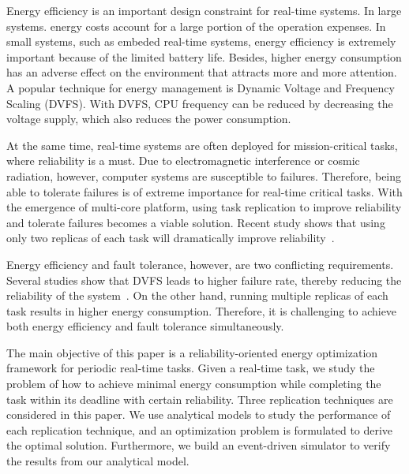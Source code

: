 Energy efficiency is an important design constraint for real-time systems. In large systems. energy costs account for a large portion of the operation expenses. In small systems, such as embeded real-time systems, energy efficiency is extremely important because of the limited battery life. Besides, higher energy consumption has an adverse effect on the environment that attracts more and more attention. 
A popular technique for energy management is Dynamic Voltage and Frequency Scaling (DVFS). With DVFS, CPU frequency can be reduced by decreasing the voltage supply, which also reduces the power consumption. 

At the same time, real-time systems are often deployed for mission-critical tasks, where reliability is a must. Due to electromagnetic interference or cosmic radiation, however, computer systems are susceptible to failures. Therefore, being able to tolerate failures is of extreme importance for real-time critical tasks.  
With the emergence of multi-core platform, using task replication to improve reliability and tolerate failures becomes a viable solution. Recent study shows that using only two replicas of each task will dramatically improve reliability~\cite{casanova2012combining}.


Energy efficiency and fault tolerance, however, are two conflicting requirements. Several studies show that DVFS leads to higher failure rate, thereby reducing the reliability of the system~\cite{1382539,6604518}. On the other hand, running multiple replicas of each task results in higher energy consumption. Therefore, it is challenging to achieve both energy efficiency and fault tolerance simultaneously. 

The main objective of this paper is a reliability-oriented energy optimization framework for periodic real-time tasks. Given a real-time task, we study the problem of how to achieve minimal energy consumption while completing the task within its deadline with certain reliability. Three replication techniques are considered in this paper. We use analytical models to study the performance of each replication technique, and an optimization problem is formulated to derive the optimal solution. Furthermore, we build an event-driven simulator to verify the results from our analytical model. 

